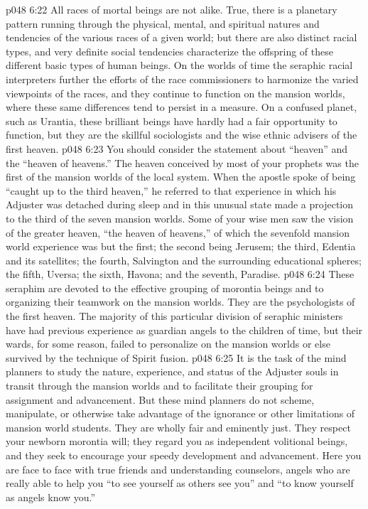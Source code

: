 \pc \vs p048 6:22 \bibnobreakspace {} All races of mortal beings are not alike. True, there is a planetary pattern running through the physical, mental, and spiritual natures and tendencies of the various races of a given world; but there are also distinct racial types, and very definite social tendencies characterize the offspring of these different basic types of human beings. On the worlds of time the seraphic racial interpreters further the efforts of the race commissioners to harmonize the varied viewpoints of the races, and they continue to function on the mansion worlds, where these same differences tend to persist in a measure. On a confused planet, such as Urantia, these brilliant beings have hardly had a fair opportunity to function, but they are the skillful sociologists and the wise ethnic advisers of the first heaven.
\pc \vs p048 6:23 You should consider the statement about “heaven” and the “heaven of heavens.” The heaven conceived by most of your prophets was the first of the mansion worlds of the local system. When the apostle spoke of being “caught up to the third heaven,” he referred to that experience in which his Adjuster was detached during sleep and in this unusual state made a projection to the third of the seven mansion worlds. Some of your wise men saw the vision of the greater heaven, “the heaven of heavens,” of which the sevenfold mansion world experience was but the first; the second being Jerusem; the third, Edentia and its satellites; the fourth, Salvington and the surrounding educational spheres; the fifth, Uversa; the sixth, Havona; and the seventh, Paradise.
\pc \vs p048 6:24 \bibnobreakspace {} These seraphim are devoted to the effective grouping of morontia beings and to organizing their teamwork on the mansion worlds. They are the psychologists of the first heaven. The majority of this particular division of seraphic ministers have had previous experience as guardian angels to the children of time, but their wards, for some reason, failed to personalize on the mansion worlds or else survived by the technique of Spirit fusion.
\vs p048 6:25 It is the task of the mind planners to study the nature, experience, and status of the Adjuster souls in transit through the mansion worlds and to facilitate their grouping for assignment and advancement. But these mind planners do not scheme, manipulate, or otherwise take advantage of the ignorance or other limitations of mansion world students. They are wholly fair and eminently just. They respect your newborn morontia will; they regard you as independent volitional beings, and they seek to encourage your speedy development and advancement. Here you are face to face with true friends and understanding counselors, angels who are really able to help you “to see yourself as others see you” and “to know yourself as angels know you.”
